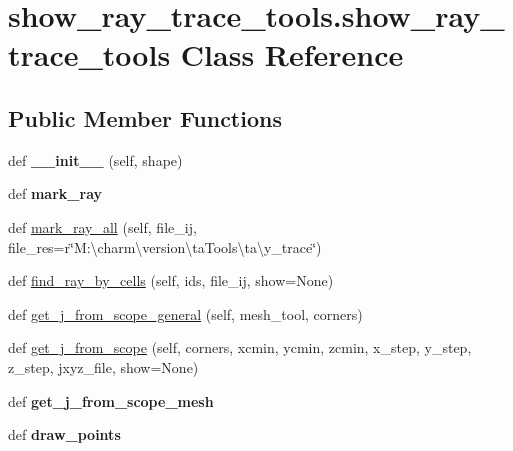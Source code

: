 \hypertarget{classshow__ray__trace__tools_1_1show__ray__trace__tools}{}\section{show\+\_\+ray\+\_\+trace\+\_\+tools.\+show\+\_\+ray\+\_\+trace\+\_\+tools Class Reference}
\label{classshow__ray__trace__tools_1_1show__ray__trace__tools}
\subsection*{Public Member Functions}
\begin{DoxyCompactItemize}
\item 
\mbox{\label{classshow__ray__trace__tools_1_1show__ray__trace__tools_a0052918cbbfc746da471f0831e2c0a1d}} 
def {\bfseries \+\_\+\+\_\+init\+\_\+\+\_\+} (self, shape)
\item 
\mbox{\label{classshow__ray__trace__tools_1_1show__ray__trace__tools_a5247b125085b41020c7845b4dcd19977}} 
def {\bfseries mark\+\_\+ray}
\item 
def \hyperlink{classshow__ray__trace__tools_1_1show__ray__trace__tools_af9976c0c593720aaadb04a0caf6b05ed}{mark\+\_\+ray\+\_\+all} (self, file\+\_\+ij, file\+\_\+res=r\char`\"{}M\+:\textbackslash{}charm\textbackslash{}version\textbackslash{}ta\+Tools\textbackslash{}ta\textbackslash{}y\+\_\+trace\char`\"{})
\item 
def \hyperlink{classshow__ray__trace__tools_1_1show__ray__trace__tools_a4ad007119a9d2eb6d061ce6f776da3ee}{find\+\_\+ray\+\_\+by\+\_\+cells} (self, ids, file\+\_\+ij, show=None)
\item 
def \hyperlink{classshow__ray__trace__tools_1_1show__ray__trace__tools_ab915e57e99a26cff5e75e09f6868fa82}{get\+\_\+j\+\_\+from\+\_\+scope\+\_\+general} (self, mesh\+\_\+tool, corners)
\item 
def \hyperlink{classshow__ray__trace__tools_1_1show__ray__trace__tools_a14b90b5847e65bcd64b58354350d9a78}{get\+\_\+j\+\_\+from\+\_\+scope} (self, corners, xcmin, ycmin, zcmin, x\+\_\+step, y\+\_\+step, z\+\_\+step, jxyz\+\_\+file, show=None)
\item 
\mbox{\label{classshow__ray__trace__tools_1_1show__ray__trace__tools_ac5bd6a1bcd1ef831e3f3954e835a94da}} 
def {\bfseries get\+\_\+j\+\_\+from\+\_\+scope\+\_\+mesh}
\item 
\mbox{\label{classshow__ray__trace__tools_1_1show__ray__trace__tools_a6b2c349f49340a6aa5f74298a9856f5e}} 
def {\bfseries draw\+\_\+points}
\end{DoxyCompactItemize}
